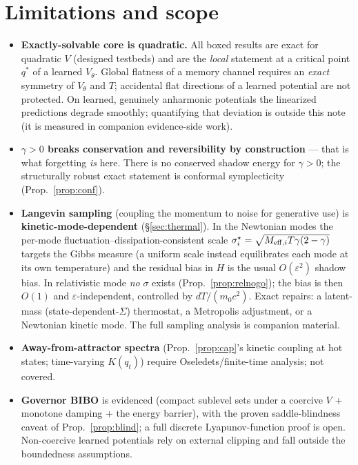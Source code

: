 \documentclass[11pt]{article}
\theoremstyle{plain}
\theoremstyle{definition}
\begin{document}
\section{Limitations and scope}
\begin{itemize}\itemsep2pt
\item \textbf{Exactly-solvable core is quadratic.} All boxed results are exact for quadratic $V$ (designed testbeds) and are the \emph{local} statement at a critical point $q^\ast$ of a learned $V_\theta$. Global flatness of a memory channel requires an \emph{exact} symmetry of $V_\theta$ and $T$; accidental flat directions of a learned potential are not protected. On learned, genuinely anharmonic potentials the linearized predictions degrade smoothly; quantifying that deviation is outside this note (it is measured in companion evidence-side work).
\item \textbf{$\gamma>0$ breaks conservation and reversibility by construction} --- that is what forgetting \emph{is} here. There is no conserved shadow energy for $\gamma>0$; the structurally robust exact statement is conformal symplecticity (Prop.~\ref{prop:conf}).
\item \textbf{Langevin sampling} (coupling the momentum to noise for generative use) is \textbf{kinetic-mode-dependent} (\S\ref{sec:thermal}). In the Newtonian modes the per-mode fluctuation--dissipation-consistent scale $\sigma_i^\star=\sqrt{M_{{\rm eff},i}T\gamma(2-\gamma)}$ targets the Gibbs measure (a uniform scale instead equilibrates each mode at its own temperature) and the residual bias in $H$ is the usual $O(\varepsilon^2)$ shadow bias. In relativistic mode \emph{no} $\sigma$ exists (Prop.~\ref{prop:relnogo}); the bias is then $O(1)$ and $\varepsilon$-independent, controlled by $dT/(m_0c^2)$. Exact repairs: a latent-mass (state-dependent-$\Sigma$) thermostat, a Metropolis adjustment, or a Newtonian kinetic mode. The full sampling analysis is companion material.
\item \textbf{Away-from-attractor spectra} (Prop.~\ref{prop:cap}'s kinetic coupling at hot states; time-varying $K(q_t)$) require Oseledets/finite-time analysis; not covered.
\item \textbf{Governor BIBO} is evidenced (compact sublevel sets under a coercive $V$ + monotone damping + the energy barrier), with the proven saddle-blindness caveat of Prop.~\ref{prop:blind}; a full discrete Lyapunov-function proof is open. Non-coercive learned potentials rely on external clipping and fall outside the boundedness assumptions.
\end{itemize}
\end{document}
